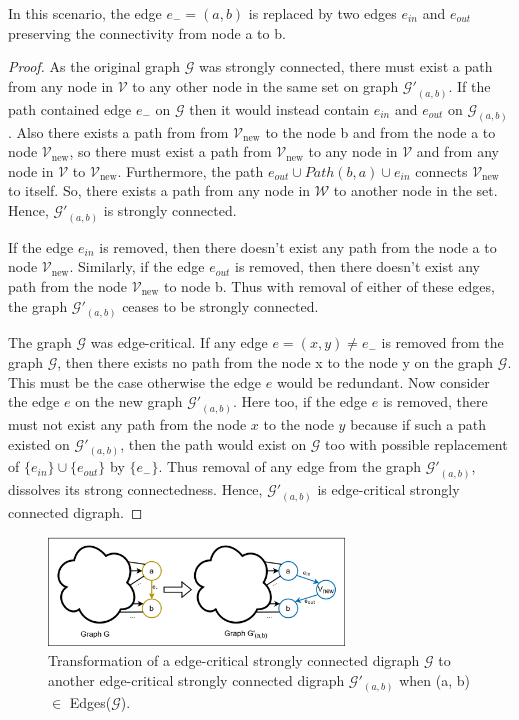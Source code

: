 \documentclass[runningheads]{llncs}
\begin{document}
In this scenario, the edge $e_{-} = (a, b)$ is replaced by two edges $e_{in}$ and $e_{out}$ preserving the connectivity from node a to b. 

\begin{proof}
As the original graph $\mathcal{G}$ was strongly connected, there must exist a path from any node in $\mathcal{V}$ to any other node in the same set on graph $\mathcal{G'}_{(a, b)}$. If the path contained edge $e_{-}$ on $\mathcal{G}$ then it would instead contain $e_{in}$ and $e_{out}$ on $\mathcal{G}_{(a, b)}$. Also there exists a path from from $\mathcal{V}_{\text{new}}$ to the node b and from the node a to node $\mathcal{V}_{\text{new}}$, so there must exist a path from $\mathcal{V}_{\text{new}}$ to any node in $\mathcal{V}$ and from any node in $\mathcal{V}$ to $\mathcal{V}_{\text{new}}$. Furthermore, the path $e_{out} \cup Path(b, a) \cup e_{in}$ connects $\mathcal{V}_{\text{new}}$ to itself. So, there exists a path from any node in $\mathcal{W}$ to another node in the set. Hence, $\mathcal{G'}_{(a, b)}$ is strongly connected.

If the edge $e_{in}$ is removed, then there doesn't exist any path from the node a to node $\mathcal{V}_{\text{new}}$. Similarly, if the edge $e_{out}$ is removed, then there doesn't exist any path from the node $\mathcal{V}_{\text{new}}$ to node b. Thus with removal of either of these edges, the graph $\mathcal{G'}_{(a, b)}$ ceases to be strongly connected. 

The graph $\mathcal{G}$ was edge-critical. If any edge $e = (x, y) \neq e_{-}$ is removed from the graph $\mathcal{G}$, then there exists no path from the node x to the node y on the graph $\mathcal{G}$. This must be the case otherwise the edge $e$ would be redundant. Now consider the edge $e$ on the new graph $\mathcal{G'}_{(a, b)}$. Here too, if the edge $e$ is removed, there must not exist any path from the node $x$ to the node $y$ because if such a path existed on $\mathcal{G'}_{(a, b)}$, then the path would exist on $\mathcal{G}$ too with possible replacement of $\{e_{in}\} \cup \{e_{out}\}$ by $\{e_{-}\}$. Thus removal of any edge from the graph $\mathcal{G'}_{(a, b)}$, dissolves its strong connectedness. Hence, $\mathcal{G'}_{(a, b)}$ is edge-critical strongly connected digraph.
\end{proof}

\begin{figure}[ht]
    \centering
    \includegraphics[width=0.7\textwidth]{fig3.png}
    \caption{Transformation of a edge-critical strongly connected digraph $\mathcal{G}$ to another edge-critical strongly connected digraph $\mathcal{G'}_{(a,b)}$ when (a, b) $\in$ Edges($\mathcal{G}$).}
    \label{fig:fig3}
\end{figure}
\end{document}
